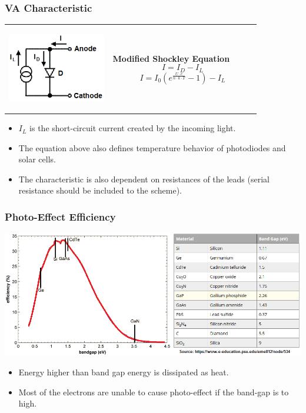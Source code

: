 \documentclass{beamer}
\begin{document}
	\begin{frame}
    \frametitle{VA Characteristic}
		\begin{tabular}{m{0.35\linewidth} m{0.5\linewidth}}
		\begin{center}
			\includegraphics[scale=0.45]{obr12_nahrSch.png}
		\end{center}
		& \textbf{Modified Shockley Equation}
		$$I = I_D - I_L$$
		$$I = I_0\left(e^{\frac{U\cdot e}{n\cdot k\cdot T}}-1\right) - I_L$$
		\end{tabular}
		
		\begin{itemize}
			\item $I_L$ is the short-circuit current created by the incoming light.
			\item The equation above also defines temperature behavior of photodiodes and solar cells.
			\item The characteristic is also dependent on resistances of the leads (serial resistance should be included to the scheme).
		\end{itemize}
	\end{frame}
	\begin{frame}
    \frametitle{Photo-Effect Efficiency}
		\begin{center}
			\includegraphics[scale=0.35]{obr03_ucinnost.png}
		\end{center}
		
		\begin{itemize}
			\item Energy higher than band gap energy is dissipated as heat.
			\item Most of the electrons are unable to cause photo-effect if the band-gap is to high.
		\end{itemize}
	\end{frame}
\end{document}
